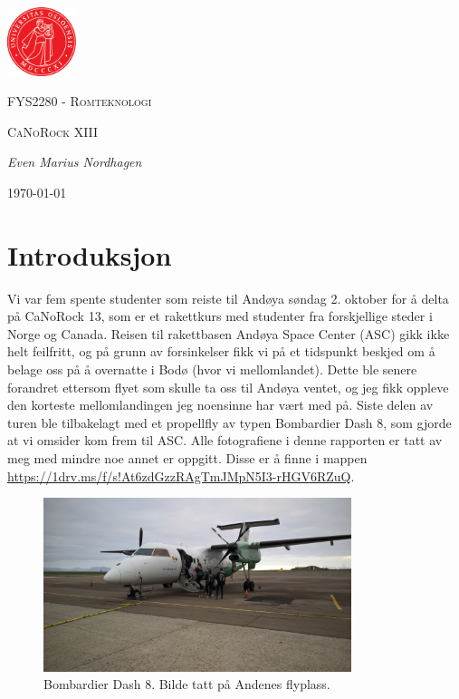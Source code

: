 \documentclass[norsk,a4paper,12pt]{article}
\begin{document}
\begin{center}
\includegraphics[width=0.15\textwidth]{uio.png}\par\vspace{1cm}
{\scshape\LARGE FYS2280 - Romteknologi \par}
\vspace{0.5cm}
{\scshape\large CaNoRock XIII\par}
\vspace{1cm}
{\Large\itshape Even Marius Nordhagen\par}
\vspace{0.5cm}
{\large \today\par}
\end{center}
\section*{Introduksjon}
Vi var fem spente studenter som reiste til And{\o}ya s{\o}ndag 2. oktober for {\aa} delta p{\aa} CaNoRock 13, som er et rakettkurs med studenter fra forskjellige steder i Norge og Canada. Reisen til rakettbasen And{\o}ya Space Center (ASC) gikk ikke helt feilfritt, og p{\aa} grunn av forsinkelser fikk vi p{\aa} et tidspunkt beskjed om {\aa} belage oss p{\aa} {\aa} overnatte i Bod{\o} (hvor vi mellomlandet). Dette ble senere forandret ettersom flyet som skulle ta oss til And{\o}ya ventet, og jeg fikk oppleve den korteste mellomlandingen jeg noensinne har v{\ae}rt med p{\aa}. Siste delen av turen ble tilbakelagt med et propellfly av typen Bombardier Dash 8, som gjorde at vi omsider kom frem til ASC. Alle fotografiene i denne rapporten er tatt av meg med mindre noe annet er oppgitt. Disse er {\aa} finne i mappen \url{https://1drv.ms/f/s!At6zdGzzRAgTmJMpN5I3-rHGV6RZuQ}.
\begin{figure}[H]
\centering
\includegraphics[width=90mm]{WP_20161007_16_11_05_Pro.jpg}
\caption{Bombardier Dash 8. Bilde tatt p{\aa} Andenes flyplass. \label{overflow}}
\end{figure}
\end{document}
